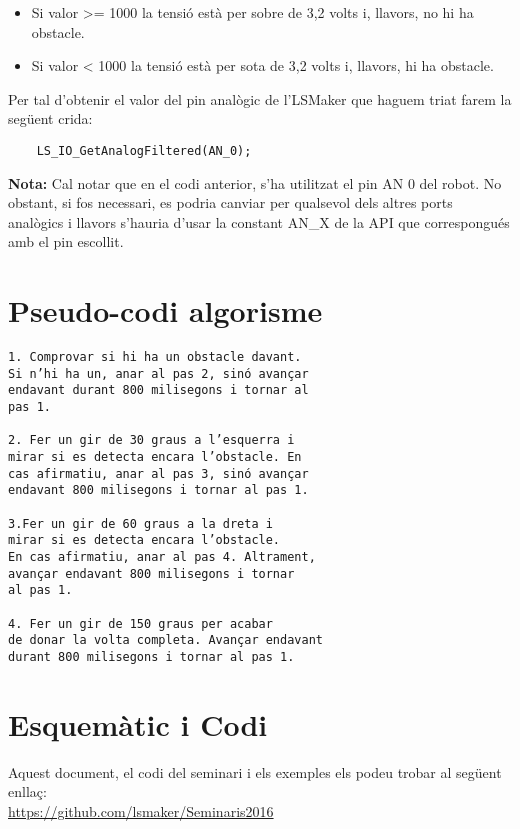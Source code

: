 \documentclass[fleqn,10pt]{SelfArx} %
\begin{document}
\begin{itemize}

	\item Si valor  >= 1000 la tensió està per sobre de 3,2 volts i, llavors, no hi ha obstacle.

	\item Si valor < 1000 la tensió està per sota de 3,2 volts i, llavors, hi ha obstacle.

\end{itemize}


\newpage
Per tal d'obtenir el valor del pin analògic de l'LSMaker que haguem triat farem la següent crida:

\begin{verbatim}
    LS_IO_GetAnalogFiltered(AN_0);
\end{verbatim}

\textbf{Nota:} Cal notar que en el codi anterior, s’ha utilitzat el pin
AN 0 del robot. No obstant, si fos necessari, es podria canviar
per qualsevol dels altres ports analògics i llavors s'hauria d'usar la constant AN\_X de la API que correspongués amb el pin escollit.

\section{Pseudo-codi algorisme}
\begin{verbatim}
1. Comprovar si hi ha un obstacle davant.
Si n’hi ha un, anar al pas 2, sinó avançar
endavant durant 800 milisegons i tornar al
pas 1.

2. Fer un gir de 30 graus a l’esquerra i
mirar si es detecta encara l’obstacle. En
cas afirmatiu, anar al pas 3, sinó avançar
endavant 800 milisegons i tornar al pas 1.

3.Fer un gir de 60 graus a la dreta i
mirar si es detecta encara l’obstacle.
En cas afirmatiu, anar al pas 4. Altrament,
avançar endavant 800 milisegons i tornar
al pas 1.

4. Fer un gir de 150 graus per acabar
de donar la volta completa. Avançar endavant
durant 800 milisegons i tornar al pas 1.
\end{verbatim}

\section{Esquemàtic i Codi}
Aquest document, el codi del seminari i els exemples els podeu trobar al següent enllaç:\\

\small{\url{https://github.com/lsmaker/Seminaris2016}}

\end{document}
